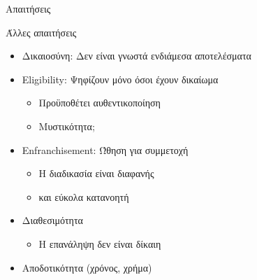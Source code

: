 \documentclass[handout]{beamer}
\begin{document}
\begin{section}{Απαιτήσεις}
\begin{frame}{Άλλες απαιτήσεις}
\begin{itemize}
    \item Δικαιοσύνη: Δεν είναι γνωστά ενδιάμεσα αποτελέσματα \pause
    \item Eligibility: Ψηφίζουν μόνο όσοι έχουν δικαίωμα
    \begin{itemize}
        \item Προϋποθέτει αυθεντικοποίηση
        \item Μυστικότητα;
    \end{itemize}  \pause
    \item Enfranchisement: Ώθηση για συμμετοχή 
    \begin{itemize}
        \item Η διαδικασία είναι διαφανής
        \item και εύκολα κατανοητή
    \end{itemize}  \pause
    \item Διαθεσιμότητα  
    \begin{itemize}
        \item Η επανάληψη δεν είναι δίκαιη
    \end{itemize} \pause
    \item Αποδοτικότητα (χρόνος, χρήμα)
\end{itemize}
\end{frame}
\end{section} 
\end{document}

